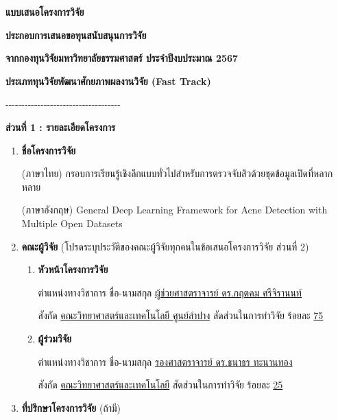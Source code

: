 \documentclass[16pt]{extarticle}
\author{}
\date{}
\begin{document}
\begin{center}
\textbf{แบบเสนอโครงการวิจัย}

\textbf{ประกอบการเสนอขอทุนสนับสนุนการวิจัย}

\textbf{จากกองทุนวิจัยมหาวิทยาลัยธรรมศาสตร์ ประจำปีงบประมาณ 2567}

\textbf{ประเภททุนวิจัยพัฒนาศักยภาพผลงานวิจัย (Fast Track)}

-\/-\/-\/-\/-\/-\/-\/-\/-\/-\/-\/-\/-\/-\/-\/-\/-\/-\/-\/-\/-\/-\/-\/-\/-\/-\/-\/-\/-\/-\/-\/-\/-\/-\/-\/-
\end{center}

\textbf{ส่วนที่ 1 : รายละเอียดโครงการ}

\begin{enumerate}[label=\arabic*., leftmargin=0pt, itemindent=2.5em, labelsep=0.5em]
\item \textbf{ชื่อโครงการวิจัย}

\noindent (ภาษาไทย) กรอบการเรียนรู้เชิงลึกแบบทั่วไปสำหรับการตรวจจับสิวด้วยชุดข้อมูลเปิดที่หลากหลาย

\noindent (ภาษาอังกฤษ) General Deep Learning Framework for Acne Detection with Multiple Open Datasets

\item \textbf{คณะผู้วิจัย} (โปรดระบุประวัติของคณะผู้วิจัยทุกคนในข้อเสนอโครงการวิจัย ส่วนที่ 2)

\begin{enumerate}[label=\arabic*., leftmargin=1.5em, itemindent=2em, labelsep=0.5em]
\item \textbf{หัวหน้าโครงการวิจัย}

\noindent\hspace{1em} ตำแหน่งทางวิชาการ ชื่อ-นามสกุล \uline{ผู้ช่วยศาสตราจารย์ ดร.กฤตคม ศรีจิรานนท์}

\noindent\hspace{1em} สังกัด \uline{คณะวิทยาศาสตร์และเทคโนโลยี ศูนย์ลำปาง} สัดส่วนในการทำวิจัย ร้อยละ \uline{75}

\item \textbf{ผู้ร่วมวิจัย}

\noindent\hspace{1em} ตำแหน่งทางวิชาการ ชื่อ-นามสกุล \uline{รองศาสตราจารย์ ดร.ธนาธร ทะนานทอง}

\noindent\hspace{1em} สังกัด \uline{คณะวิทยาศาสตร์และเทคโนโลยี} สัดส่วนในการทำวิจัย ร้อยละ \uline{25}
\end{enumerate}

\item \textbf{ที่ปรึกษาโครงการวิจัย} (ถ้ามี)


\end{enumerate}
\end{document}

